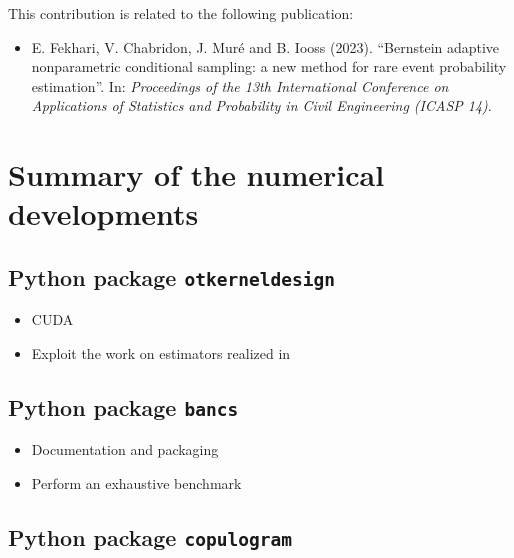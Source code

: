 This contribution is related to the following publication:
\begin{itemize}
    \footnotesize
    \item[\ding{125}] E. Fekhari, V. Chabridon, J. Muré and B. Iooss (2023). ``Bernstein adaptive nonparametric conditional sampling: a new method for rare event probability estimation''. In: \textit{Proceedings of the 13th International Conference on Applications of Statistics and Probability in Civil Engineering (ICASP 14)}.
\end{itemize}




\section*{Summary of the numerical developments}

\subsection*{Python package \texttt{otkerneldesign}}
\begin{itemize}
    \item CUDA 
    \item Exploit the work on estimators realized in \ot
\end{itemize}


\subsection*{Python package \texttt{bancs}}

\begin{itemize}
    \item Documentation and packaging
    \item Perform an exhaustive benchmark
\end{itemize}

\subsection*{Python package \texttt{copulogram}}

